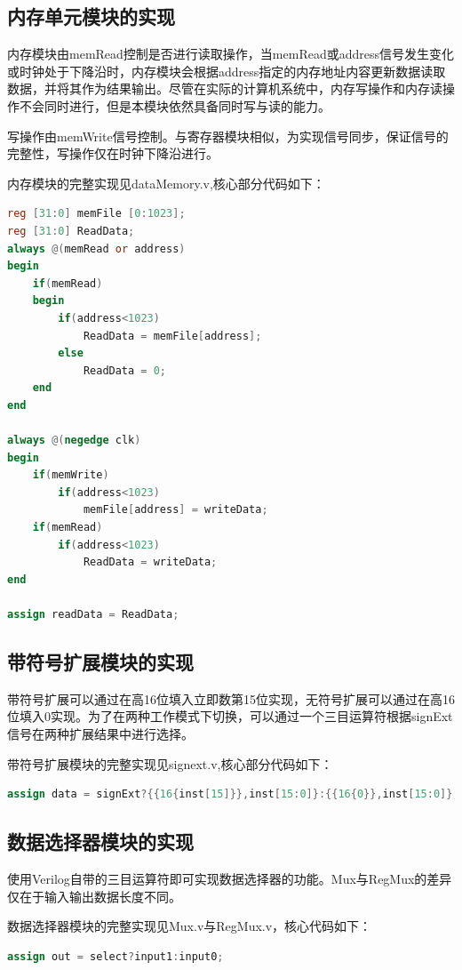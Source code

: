 \documentclass[UTF8]{ctexart}
\begin{document}
\subsection{内存单元模块的实现}
内存模块由memRead控制是否进行读取操作，当memRead或address信号发生变化或时钟处于下降沿时，内存模块会根据address指定的内存地址内容更新数据读取数据，并将其作为结果输出。尽管在实际的计算机系统中，内存写操作和内存读操作不会同时进行，但是本模块依然具备同时写与读的能力。\par
写操作由memWrite信号控制。与寄存器模块相似，为实现信号同步，保证信号的完整性，写操作仅在时钟下降沿进行。\par
内存模块的完整实现见dataMemory.v,核心部分代码如下：
\begin{lstlisting}[language=verilog]
reg [31:0] memFile [0:1023];
reg [31:0] ReadData;
always @(memRead or address) 
begin
    if(memRead)
    begin
        if(address<1023)
            ReadData = memFile[address];
        else
            ReadData = 0;
    end
end

always @(negedge clk)
begin
    if(memWrite)
        if(address<1023)
            memFile[address] = writeData;
    if(memRead)
        if(address<1023)
            ReadData = writeData;
end

assign readData = ReadData;
\end{lstlisting}
\subsection{带符号扩展模块的实现}
    带符号扩展可以通过在高16位填入立即数第15位实现，无符号扩展可以通过在高16位填入0实现。为了在两种工作模式下切换，可以通过一个三目运算符根据signExt信号在两种扩展结果中进行选择。\par
    带符号扩展模块的完整实现见signext.v,核心部分代码如下：
\begin{lstlisting}[language=verilog]
assign data = signExt?{{16{inst[15]}},inst[15:0]}:{{16{0}},inst[15:0]};
\end{lstlisting}

\subsection{数据选择器模块的实现}
    使用Verilog自带的三目运算符即可实现数据选择器的功能。Mux与RegMux的差异仅在于输入输出数据长度不同。\par
    数据选择器模块的完整实现见Mux.v与RegMux.v，核心代码如下：
\begin{lstlisting}[language=verilog]
assign out = select?input1:input0;
\end{lstlisting}
\end{document}
